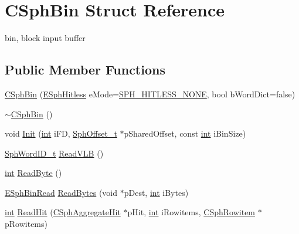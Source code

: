 \hypertarget{structCSphBin}{\section{C\-Sph\-Bin Struct Reference}
\label{structCSphBin}
}


bin, block input buffer  


\subsection*{Public Member Functions}
\begin{DoxyCompactItemize}
\item 
\hyperlink{structCSphBin_a56390f68af2b17dc1fa7fce36aff7da3}{C\-Sph\-Bin} (\hyperlink{sphinx_8h_a1920852c5151009d65cf2bc8204a685b}{E\-Sph\-Hitless} e\-Mode=\hyperlink{sphinx_8h_a1920852c5151009d65cf2bc8204a685bab717040a78109532d033c43c9066bfb4}{S\-P\-H\-\_\-\-H\-I\-T\-L\-E\-S\-S\-\_\-\-N\-O\-N\-E}, bool b\-Word\-Dict=false)
\item 
\hyperlink{structCSphBin_a6c096a330f87e66512786a8b71dc9e03}{$\sim$\-C\-Sph\-Bin} ()
\item 
void \hyperlink{structCSphBin_a2c38b2d71959f86907bacdac66869814}{Init} (\hyperlink{sphinxexpr_8cpp_a4a26e8f9cb8b736e0c4cbf4d16de985e}{int} i\-F\-D, \hyperlink{sphinx_8h_a0fb3b64afebef33c61367714754eaa90}{Sph\-Offset\-\_\-t} $\ast$p\-Shared\-Offset, const \hyperlink{sphinxexpr_8cpp_a4a26e8f9cb8b736e0c4cbf4d16de985e}{int} i\-Bin\-Size)
\item 
\hyperlink{sphinx_8h_a80a94d5984fdf9214a98f3e5e65df963}{Sph\-Word\-I\-D\-\_\-t} \hyperlink{structCSphBin_aae8155e54e16d8d4002302a7261ae765}{Read\-V\-L\-B} ()
\item 
\hyperlink{sphinxexpr_8cpp_a4a26e8f9cb8b736e0c4cbf4d16de985e}{int} \hyperlink{structCSphBin_a4eb6516c0e9058a9e6a61dbbfe1fc7ec}{Read\-Byte} ()
\item 
\hyperlink{sphinx_8cpp_ac9b00943d3f5ca56056fdc4c7cb8f58c}{E\-Sph\-Bin\-Read} \hyperlink{structCSphBin_ad5c6ae711b3ec1b7a8f08c27af3e8b58}{Read\-Bytes} (void $\ast$p\-Dest, \hyperlink{sphinxexpr_8cpp_a4a26e8f9cb8b736e0c4cbf4d16de985e}{int} i\-Bytes)
\item 
\hyperlink{sphinxexpr_8cpp_a4a26e8f9cb8b736e0c4cbf4d16de985e}{int} \hyperlink{structCSphBin_ae7318babf0207548eb696d319eac4822}{Read\-Hit} (\hyperlink{structCSphAggregateHit}{C\-Sph\-Aggregate\-Hit} $\ast$p\-Hit, \hyperlink{sphinxexpr_8cpp_a4a26e8f9cb8b736e0c4cbf4d16de985e}{int} i\-Rowitems, \hyperlink{sphinx_8h_a6a2df0f05f3397df8b6e230fda6f852f}{C\-Sph\-Rowitem} $\ast$p\-Rowitems)

\end{DoxyCompactItemize}
